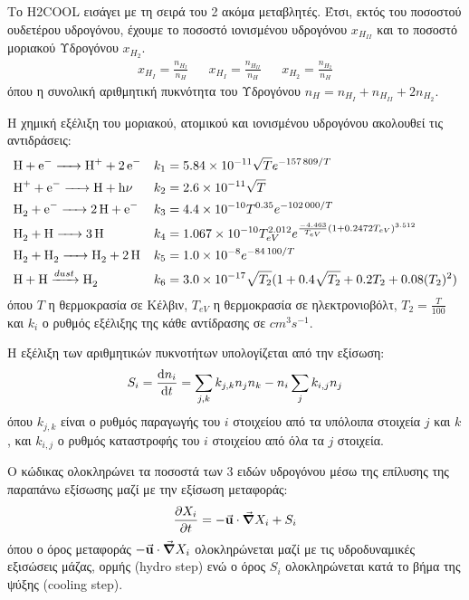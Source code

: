 	Το H2COOL εισάγει με τη σειρά του 2 ακόμα μεταβλητές. Έτσι, εκτός του ποσοστού ουδετέρου υδρογόνου, έχουμε το ποσοστό ιονισμένου υδρογόνου $x_{H_{II}}$ και το ποσοστό μοριακού Υδρογόνου $x_{H_2}$.
	\begin{align}
	x_{H_I} =\frac{n_{H_I}}{n_H} && x_{H_I} =\frac{n_{H_{II}}}{n_H} && x_{H_2} =\frac{n_{H_2}}{n_H} 
	\end{align}
	όπου η συνολική αριθμητική πυκνότητα του Υδρογόνου $n_H=n_{H_I}+n_{H_{II}}+2n_{H_2}$.
	
	Η χημική εξέλιξη του μοριακού, ατομικού και ιονισμένου υδρογόνου ακολουθεί τις αντιδράσεις:
	\begin{align}
	&\ce{H + e^- -> H^+ + 2e^-} && k_1 = \num{5.84e-11} \sqrt{T} e^{\num{-157809}/T} \\
	&\ce{H^+ + e^- -> H + h\nu} && k_2 = \num{2.6e-11} \sqrt{T}\\
	&\ce{H_2 + e^- -> 2H + e^-} && k_3 = \num{4.4e-10}T^{0.35} e^{\num{-102000}/T}\\
	&\ce{H_2 + H -> 3H} && k_4=\num{1.067e-10}T_{eV}^{2.012} e^{\frac{\num{-4.463}}{T_{eV}}(1+\num{0.2472}T_{eV})^{3.512}}\\
	&\ce{H_2 + H_2 -> H_2 + 2H} && k_5=\num{1.0e-8}e^{-\num{84100}/T} \\
	&\ce{H + H ->[dust] H_2} && k_6=\num{3.0e-17}\sqrt{T_2} (1+0.4\sqrt{T_2}+0.2 T_2 +0.08 (T_2)^2)
	\end{align}
	όπου $T$ η θερμοκρασία σε Κέλβιν, $T_{eV}$ η θερμοκρασία σε ηλεκτρονιοβόλτ, $T_2=\frac{T}{100}$ και $k_i$ ο ρυθμός εξέλιξης της κάθε αντίδρασης σε $\si{cm^3 s^{-1}}$.
	
	Η εξέλιξη των αριθμητικών πυκνοτήτων υπολογίζεται από την εξίσωση:
	\begin{equation}
	S_i=\dv{n_i}{t}=\sum\limits_{j,k}k_{j,k}n_j n_k - n_i \sum_{j}k_{i,j}n_j
	\end{equation}
	όπου $k_{j,k}$ είναι ο ρυθμός παραγωγής του $i$ στοιχείου από τα υπόλοιπα στοιχεία $j$ και $k$, και $k_{i,j}$ ο ρυθμός καταστροφής του $i$ στοιχείου από όλα τα $j$ στοιχεία.
	
	Ο κώδικας ολοκληρώνει τα ποσοστά των 3 ειδών υδρογόνου μέσω της επίλυσης της παραπάνω εξίσωσης μαζί με την εξίσωση μεταφοράς:
	\begin{equation}
	\pdv{X_i}{t}=-\va{u}\cdot \grad{X_i}+S_i
	\end{equation}
	όπου ο όρος μεταφοράς $-\va{u}\cdot \grad{X_i}$ ολοκληρώνεται μαζί με τις υδροδυναμικές εξισώσεις μάζας, ορμής (hydro step) ενώ ο όρος $S_i$ ολοκληρώνεται κατά το βήμα της ψύξης (cooling step).
	
